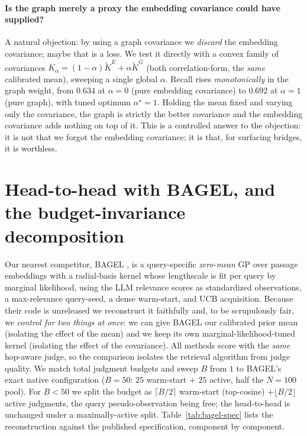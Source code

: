 \documentclass[11pt]{article}
\theoremstyle{plain}
\theoremstyle{definition}
\theoremstyle{remark}
\begin{document}
\paragraph{Is the graph merely a proxy the embedding covariance could have supplied?} A natural objection: by using
a graph covariance we \emph{discard} the embedding covariance; maybe that is a loss. We test it directly with a
convex family of covariances $K_\alpha=(1-\alpha)\widetilde K^E+\alpha\widetilde K^G$ (both correlation-form, the
\emph{same} calibrated mean), sweeping a single global $\alpha$. Recall rises \emph{monotonically} in the graph
weight, from $0.634$ at $\alpha=0$ (pure embedding covariance) to $0.692$ at $\alpha=1$ (pure graph), with tuned
optimum $\alpha^\star=1$. Holding the mean fixed and varying only the covariance, the graph is strictly the better
covariance and the embedding covariance adds nothing on top of it. This is a controlled answer to the objection: it
is not that we forgot the embedding covariance; it is that, for surfacing bridges, it is worthless.

\section{Head-to-head with BAGEL, and the budget-invariance decomposition}\label{sec:bagel}
Our nearest competitor, BAGEL \citep{bagel2026}, is a query-specific \emph{zero-mean} GP over passage embeddings
with a radial-basis kernel whose lengthscale is fit per query by marginal likelihood, using the LLM relevance scores
as standardized observations, a max-relevance query-seed, a dense warm-start, and UCB acquisition. Because their
code is unreleased we reconstruct it faithfully and, to be scrupulously fair, we \emph{control for two things at
once}: we can give BAGEL our calibrated prior mean (isolating the effect of the mean) and we keep its own
marginal-likelihood-tuned kernel (isolating the effect of the covariance). All methods score with the \emph{same}
hop-aware judge, so the comparison isolates the retrieval algorithm from judge quality. We match total judgment budgets and sweep
$B$ from $1$ to BAGEL's exact native configuration ($B=50$: $25$ warm-start $+$ $25$ active, half the $N=100$ pool).
For $B<50$ we split the budget as $\lceil B/2\rceil$ warm-start (top-cosine) $+\lfloor B/2\rfloor$ active judgments,
the query pseudo-observation being free; the head-to-head is unchanged under a maximally-active split.
Table~\ref{tab:bagel-spec} lists the reconstruction against the published specification, component by component.
\end{document}
